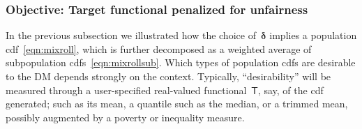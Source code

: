 \documentclass[11pt, a4paper]{article}
\theoremstyle{definition}
\begin{document}
\subsubsection{Objective: Target functional penalized for unfairness}\label{ssec:obj}

In the previous subsection we illustrated how the choice of~$\bm{\delta}$ implies a population cdf~\eqref{eqn:mixroll}, which is further decomposed as a weighted average of subpopulation cdfs~\eqref{eqn:mixrollsub}. Which types of population cdfs are desirable to the DM depends strongly on the context. Typically, ``desirability'' will be measured through a user-specified real-valued functional~$\mathsf{T}$, say, of the cdf generated; such as its mean, a quantile such as the median, or a trimmed mean, possibly augmented by a poverty or inequality measure. 
\end{document}
